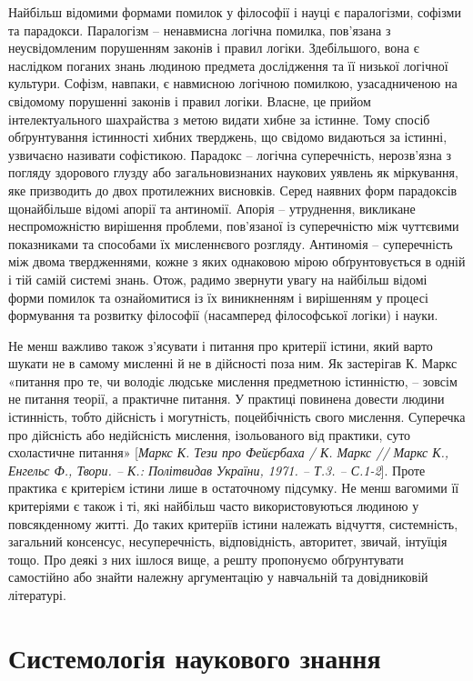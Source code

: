 Найбільш відомими формами помилок у філософії і науці є паралогізми,
софізми та парадокси. Паралогізм – ненавмисна логічна помилка, пов’язана з
неусвідомленим порушенням законів і правил логіки. Здебільшого, вона є
наслідком поганих знань людиною предмета дослідження та її низької логічної
культури. Софізм, навпаки, є навмисною логічною помилкою, узасадниченою
на свідомому порушенні законів і правил логіки. Власне, це прийом
інтелектуального шахрайства з метою видати хибне за істинне. Тому спосіб
обґрунтування істинності хибних тверджень, що свідомо видаються за істинні,
узвичаєно називати софістикою. Парадокс – логічна суперечність, нерозв’язна з
погляду здорового глузду або загальновизнаних наукових уявлень як
міркування, яке призводить до двох протилежних висновків. Серед наявних
форм парадоксів щонайбільше відомі апорії та антиномії. Апорія – утруднення,
викликане неспроможністю вирішення проблеми, пов’язаної із суперечністю
між чуттєвими показниками та способами їх мисленнєвого розгляду. Антиномія
– суперечність між двома твердженнями, кожне з яких однаковою мірою
обґрунтовується в одній і тій самій системі знань. Отож, радимо звернути увагу
на найбільш відомі форми помилок та ознайомитися із їх виникненням і
вирішенням у процесі формування та розвитку філософії (насамперед
філософської логіки) і науки.

Не менш важливо також з’ясувати і питання про критерії істини, який варто
шукати не в самому мисленні й не в дійсності поза ним. Як застерігав К. Маркс
«питання про те, чи володіє людське мислення предметною істинністю, –
зовсім не питання теорії, а практичне питання. У практиці повинена довести
людини істинність, тобто дійсність і могутність, поцейбічність свого мислення.
Суперечка про дійсність або недійсність мислення, ізольованого від практики,
суто схоластичне питання» [\textit{Маркс К. Тези про Фейєрбаха / К. Маркс // Маркс
К., Енгельс Ф., Твори. – К.: Політвидав України, 1971. – Т.3. – С.1-2}]. Проте
практика є критерієм істини лише в остаточному підсумку. Не менш вагомими
її критеріями є також і ті, які найбільш часто використовуються людиною у
повсякденному житті. До таких критеріїв істини належать відчуття,
системність, загальний консенсус, несуперечність, відповідність, авторитет,
звичай, інтуїція тощо. Про деякі з них ішлося вище, а решту пропонуємо
обґрунтувати самостійно або знайти належну аргументацію у навчальній та
довідниковій літературі.

\section{Системологія наукового знання}

